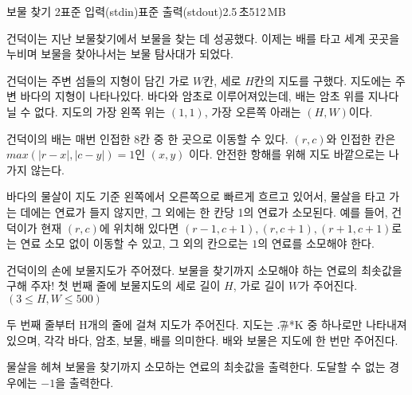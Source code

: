 \begin{problem}{보물 찾기 2}{표준 입력(stdin)}{표준 출력(stdout)}{2.5\,초}{512\,MB}

건덕이는 지난 보물찾기에서 보물을 찾는 데 성공했다. 이제는 배를 타고 세계 곳곳을 누비며 보물을 찾아나서는 보물 탐사대가 되었다.

건덕이는 주변 섬들의 지형이 담긴 가로 $W$칸, 세로 $H$칸의 지도를 구했다. 지도에는 주변 바다의 지형이 나타나있다. 바다와 암초로 이루어져있는데, 배는 암초 위를 지나다닐 수 없다. 지도의 가장 왼쪽 위는 $(1, 1)$, 가장 오른쪽 아래는 $(H, W)$이다.

건덕이의 배는 매번 인접한 8칸 중 한 곳으로 이동할 수 있다. $(r,c)$와 인접한 칸은 $max(|r-x|, |c-y|) = 1$인 $(x, y)$ 이다. 안전한 항해를 위해 지도 바깥으로는 나가지 않는다.

바다의 물살이 지도 기준 왼쪽에서 오른쪽으로 빠르게 흐르고 있어서, 물살을 타고 가는 데에는 연료가 들지 않지만, 그 외에는 한 칸당 1의 연료가 소모된다.
예를 들어, 건덕이가 현재 $(r, c)$에 위치해 있다면 $(r-1, c+1), (r, c+1), (r+1, c+1)$로는 연료 소모 없이 이동할 수 있고, 그 외의 칸으로는 $1$의 연료를 소모해야 한다.

건덕이의 손에 보물지도가 주어졌다. 보물을 찾기까지 소모해야 하는 연료의 최솟값을 구해 주자!
\InputFile
첫 번째 줄에 보물지도의 세로 길이 $H$, 가로 길이 $W$가 주어진다. $(3 \le H, W \le 500)$

두 번째 줄부터 H개의 줄에 걸쳐 지도가 주어진다. 지도는 \t{.\#*K} 중 하나로만 나타내져 있으며, 각각 바다, 암초, 보물, 배를 의미한다. 배와 보물은 지도에 한 번만 주어진다.

\OutputFile
물살을 헤쳐 보물을 찾기까지 소모하는 연료의 최솟값을 출력한다. 도달할 수 없는 경우에는 $-1$을 출력한다.

\Examples

\begin{example}
%
%
%
\end{example}

\end{problem}
